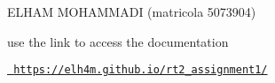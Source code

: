 E\+L\+H\+AM M\+O\+H\+A\+M\+M\+A\+DI (matricola 5073904)

use the link to access the documentation

\href{https://elh4m.github.io/rt2_assignment1/}{\texttt{ https\+://elh4m.\+github.\+io/rt2\+\_\+assignment1/}} 